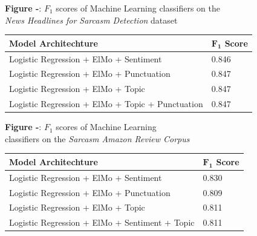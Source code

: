 \documentclass[12pt,a4paper]{article}
\begin{document}
\begin{center}
	\textbf{Figure -}: $F_1$ scores of Machine Learning classifiers on the \\\textit{News Headlines for Sarcasm Detection} dataset
\end{center}

\begin{center}
	\begin{tabular}{ |p{9cm}||p{2cm}|  }
		\hline
		\textbf{Model Architechture}&  \textbf{$\mathbf{F_1}$ Score}\\
		\hline\hline
		Logistic Regression + ElMo + Sentiment   & 0.846\\
		Logistic Regression + ElMo + Punctuation & 0.847\\
		Logistic Regression + ElMo + Topic   & 0.847\\
		Logistic Regression + ElMo + Topic + Punctuation   & 0.847\\
		\hline
	\end{tabular}
\end{center}



\begin{center}
	\textbf{Figure -}: $F_1$ scores of Machine Learning\\ classifiers on the \textit{Sarcasm Amazon Review Corpus}
\end{center}

\begin{center}
	\begin{tabular}{ |p{9cm}||p{2cm}|}
		\hline
		\textbf{Model Architechture}&  \textbf{$\mathbf{F_1}$ Score}\\
		\hline\hline
		Logistic Regression + ElMo + Sentiment   & 0.830\\
		Logistic Regression + ElMo + Punctuation & 0.809\\
		Logistic Regression + ElMo + Topic   & 0.811\\
		Logistic Regression + ElMo + Sentiment + Topic & 0.811\\
		\hline
	\end{tabular}
\end{center}

\end{document}
